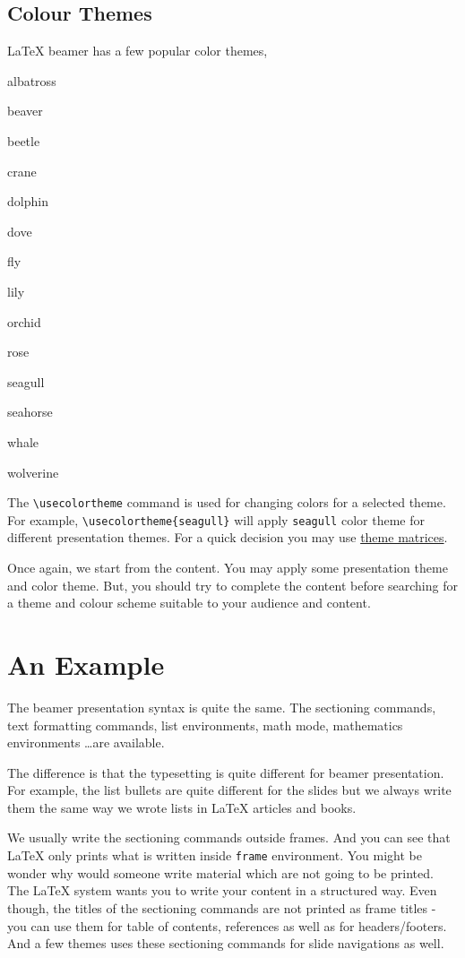 \documentclass{article}
\begin{document}
\subsection{Colour Themes}
\LaTeX{} beamer has a few popular color themes,
\begin{enumerate*}
	\item albatross
	\item beaver
	\item beetle
	\item crane
	\item dolphin
	\item dove
	\item fly
	\item lily
	\item orchid
	\item rose
	\item seagull
	\item seahorse
	\item whale
	\item wolverine
\end{enumerate*}

	The \texttt{\textbackslash usecolortheme} command is used for changing colors for a selected theme. For example, \texttt{\textbackslash usecolortheme\{seagull\}} will apply \texttt{seagull} color theme for different presentation themes. For a quick decision you may use \href{https://hartwork.org/beamer-theme-matrix/}{theme matrices}.

	Once again, we start from the content. You may apply some presentation theme and color theme. But, you should try to complete the content before searching for a theme and colour scheme suitable to your audience and content.

\section{An Example}
	The beamer presentation syntax is quite the same. The sectioning commands, text formatting commands, list environments, math mode, mathematics environments \dots are available.

	The difference is that the typesetting is quite different for beamer presentation. For example, the list bullets are quite different for the slides but we always write them the same way we wrote lists in \LaTeX{} articles and books.

	We usually write the sectioning commands outside frames. And you can see that \LaTeX{} only prints what is written inside \texttt{frame} environment. You might be wonder why would someone write material which are not going to be printed. The \LaTeX{} system wants you to write your content in a structured way. Even though, the titles of the sectioning commands are not printed as frame titles - you can use them for table of contents, references as well as for headers/footers. And a few themes uses these sectioning commands for slide navigations as well.
\end{document}
